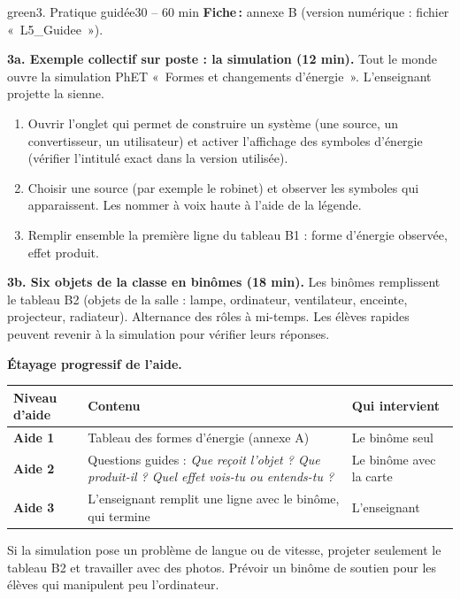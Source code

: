 \documentclass[11pt,a4paper]{article}
\begin{document}
\begin{etape}{green}{3. Pratique guidée}{30 -- 60 min}
\textbf{Fiche\,:} annexe B (version numérique : fichier «~L5\_Guidee~»).

\medskip
\textbf{3a. Exemple collectif sur poste : la simulation (12 min).} Tout le monde ouvre la simulation PhET «~Formes et changements d'énergie~». L'enseignant projette la sienne.
\begin{enumerate}
 \item Ouvrir l'onglet qui permet de construire un système (une source, un convertisseur, un utilisateur) et activer l'affichage des symboles d'énergie (vérifier l'intitulé exact dans la version utilisée).
 \item Choisir une source (par exemple le robinet) et observer les symboles qui apparaissent. Les nommer à voix haute à l'aide de la légende.
 \item Remplir ensemble la première ligne du tableau B1 : forme d'énergie observée, effet produit.
\end{enumerate}

\textbf{3b. Six objets de la classe en binômes (18 min).} Les binômes remplissent le tableau B2 (objets de la salle : lampe, ordinateur, ventilateur, enceinte, projecteur, radiateur). Alternance des rôles à mi-temps. Les élèves rapides peuvent revenir à la simulation pour vérifier leurs réponses.

\textbf{Étayage progressif de l'aide.}
\begin{center}
\begin{tabularx}{\linewidth}{>{\bfseries}p{2.4cm}Y p{4.6cm}}
\toprule
Niveau d'aide & Contenu & Qui intervient\\
\midrule
Aide 1 & Tableau des formes d'énergie (annexe A) & Le binôme seul\\
Aide 2 & Questions guides : \emph{Que reçoit l'objet ? Que produit-il ? Quel effet vois-tu ou entends-tu ?} & Le binôme avec la carte\\
Aide 3 & L'enseignant remplit une ligne avec le binôme, qui termine & L'enseignant\\
\bottomrule
\end{tabularx}
\end{center}

\begin{astuce}
Si la simulation pose un problème de langue ou de vitesse, projeter seulement le tableau B2 et travailler avec des photos. Prévoir un binôme de soutien pour les élèves qui manipulent peu l'ordinateur.
\end{astuce}
\end{etape}
\end{document}
